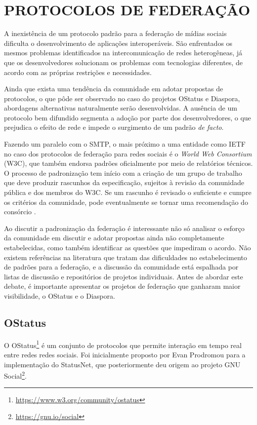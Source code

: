 \section{PROTOCOLOS DE FEDERAÇÃO}

A inexistência de um protocolo padrão para a federação de mídias sociais dificulta
o desenvolvimento de aplicações interoperáveis. São enfrentados os mesmos problemas
identificados na intercomunicação de redes heterogêneas, já que os desenvolvedores
solucionam os problemas com tecnologias diferentes, de acordo com as próprias
restrições e necessidades.

Ainda que exista uma tendência da comunidade em adotar propostas de protocolos, o
que pôde ser observado no caso do projetos OStatus e Diaspora, abordagens
alternativas naturalmente serão desenvolvidas. A ausência de um protocolo bem
difundido segmenta a adoção por parte dos desenvolvedores, o que prejudica o efeito
de rede e impede o surgimento de um padrão \textit{de facto}.

Fazendo um paralelo com o SMTP, o mais próximo a uma entidade como IETF no caso dos
protocolos de federação para redes sociais é o \textit{World Web Consortium} (W3C),
que também endorsa padrões oficialmente por meio de relatórios técnicos. O processo
de padronização tem início com a criação de um grupo de trabalho que deve produzir
rascunhos da especificação, sujeitos à revisão da comunidade pública e dos membros
do W3C. Se um rascunho é revisado o suficiente e cumpre os critérios da comunidade,
pode eventualmente se tornar uma recomendação do consórcio \cite{nevile2015}.

Ao discutir a padronização da federação é interessante não só analisar o esforço da
comunidade em discutir e adotar propostas ainda não completamente estabelecidas,
como também identificar as questões que impediram o acordo. Não existem referências
na literatura que tratam das dificuldades no estabelecimento de padrões para a
federação, e a discussão da comunidade está espalhada por listas de discussão e
repositórios de projetos individuais. Antes de abordar este debate, é importante
apresentar os projetos de federação que ganharam maior visibilidade, o OStatus e o
Diaspora.


\subsection{OStatus}

O OStatus\footnote{\url{https://www.w3.org/community/ostatus}} é um conjunto de
protocolos que permite interação em tempo real entre redes redes sociais. Foi
inicialmente proposto por Evan Prodromou para a implementação do StatusNet, que
posteriormente deu origem ao projeto GNU
Social\footnote{\url{https://gnu.io/social}}.

